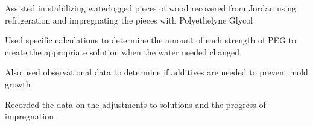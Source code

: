 \documentclass[letterpaper]{resume}
\begin{document}
%



\begin{compactitem}
\item Assisted in stabilizing waterlogged pieces of wood recovered from Jordan using refrigeration and impregnating the pieces with Polyethelyne Glycol
\item Used specific calculations to determine the amount of each strength of PEG to create the appropriate solution when the water needed changed
\item Also used observational data to determine if additives are needed to prevent mold growth
\item Recorded the data on the adjustments to solutions and the progress of impregnation
\end{compactitem}
\end{document}
